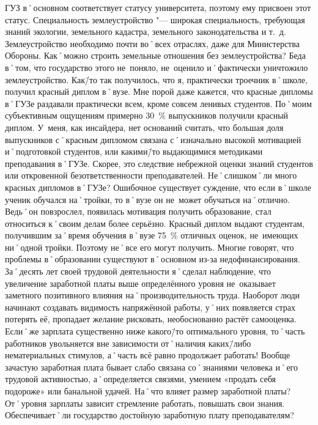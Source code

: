 \begin{drama}
	\michaelspeaks ГУЗ в˚основном соответствует статусу университета, поэтому ему присвоен этот статус. Специальность землеустройство "--- широкая специальность, требующая знаний экологии, земельного кадастра, земельного законодательства и т.~д. Землеустройство необходимо почти во˚всех отраслях, даже для Министерства Обороны. Как˚можно строить земельные отношения без землеустройства? Беда в˚том, что государство этого не~поняло, не~оценило и˚фактически уничтожило землеустройство.
	\maxspeaks Как\=/то так получилось, что я, практически троечник в˚школе, получил красный диплом в˚вузе. Мне порой даже кажется, что красные дипломы в˚ГУЗе раздавали практически всем, кроме совсем ленивых студентов. По˚моим субъективным ощущениям примерно 30~\% выпускников получили красный диплом. У~меня, как инсайдера, нет оснований считать, что большая доля выпускников с˚красным дипломом связана с˚изначально высокой мотивацией и˚подготовкой студентов, или какими\=/то выдающимися методиками преподавания в˚ГУЗе. Скорее, это следствие небрежной оценки знаний студентов или откровенной безответственности преподавателей. Не˚слишком˚ли много красных дипломов в˚ГУЗе?
	\michaelspeaks Ошибочное существует суждение, что если в˚школе ученик обучался на˚тройки, то в˚вузе он не~может обучаться на˚отлично. Ведь˚он повзрослел, появилась мотивация получить образование, стал относиться к˚своим делам более серьёзно. Красный диплом выдают студентам, получившим за˚время обучения в˚вузе 75~\% отличных оценок, не~имеющих ни˚одной тройки. Поэтому не˚все его могут получить.
	\maxspeaks Многие говорят, что проблемы в˚образовании существуют в˚основном из-за недофинансирования. За˚десять лет своей трудовой деятельности я˚сделал наблюдение, что увеличение заработной платы выше определённого уровня не~оказывает заметного позитивного влияния на˚производительность труда. Наоборот люди начинают создавать видимость напряжённой работы, у˚них появляется страх потерять её, пропадает желание рисковать, необоснованно растёт самооценка. Если˚же зарплата существенно ниже какого\=/то оптимального уровня, то˚часть работников увольняется вне зависимости от˚наличия каких\=/либо нематериальных стимулов, а˚часть всё равно продолжает работать! Вообще зачастую заработная плата бывает слабо связана со˚знаниями человека и˚его трудовой активностью, а˚определяется связями, умением  «продать себя подороже» или банальной удачей. На˚что влияет размер заработной платы?
	\michaelspeaks От˚уровня зарплаты зависит стремление работать, повышать свои знания.
	\maxspeaks Обеспечивает˚ли государство достойную заработную плату преподавателям? 

\end{drama}
